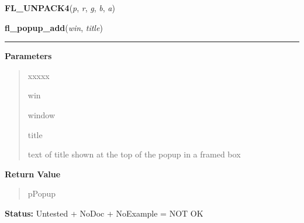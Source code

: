     \label{xformslib:library:FL_UNPACK4}

    \vspace{0.5ex}

\hspace{.8\funcindent}\begin{boxedminipage}{\funcwidth}

    \raggedright \textbf{FL\_UNPACK4}(\textit{p}, \textit{r}, \textit{g}, \textit{b}, \textit{a})

\setlength{\parskip}{2ex}
\setlength{\parskip}{1ex}
    \end{boxedminipage}

    \label{xformslib:library:fl_popup_add}

    \vspace{0.5ex}

\hspace{.8\funcindent}\begin{boxedminipage}{\funcwidth}

    \raggedright \textbf{fl\_popup\_add}(\textit{win}, \textit{title})

    \vspace{-1.5ex}

    \rule{\textwidth}{0.5\fboxrule}
\setlength{\parskip}{2ex}
\setlength{\parskip}{1ex}
      \textbf{Parameters}
      \vspace{-1ex}

      \begin{quote}
        \begin{Ventry}{xxxxx}

          \item[win]

          window

          \item[title]

          text of title shown at the top of the popup in a framed box

        \end{Ventry}

      \end{quote}

      \textbf{Return Value}
    \vspace{-1ex}

      \begin{quote}
      pPopup

      \end{quote}

\textbf{Status:} Untested + NoDoc + NoExample = NOT OK



    \end{boxedminipage}

